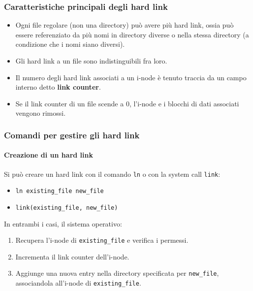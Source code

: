 \subsubsection{Caratteristiche principali degli hard link}
\begin{itemize}
    \item Ogni file regolare (non una directory) può avere più hard link, ossia può essere referenziato da più nomi in directory diverse o nella stessa directory (a condizione che i nomi siano diversi).
    \item Gli hard link a un file sono indistinguibili fra loro.
    \item Il numero degli hard link associati a un i-node è tenuto traccia da un campo interno detto \textbf{link counter}.
    \item Se il link counter di un file scende a 0, l'i-node e i blocchi di dati associati vengono rimossi.
\end{itemize}

\subsubsection{Comandi per gestire gli hard link}
\paragraph{Creazione di un hard link}
Si può creare un hard link con il comando \texttt{ln} o con la system call \texttt{link}:
\begin{itemize}
    \item \texttt{ln existing\_file new\_file}
    \item \texttt{link(existing\_file, new\_file)}
\end{itemize}
In entrambi i casi, il sistema operativo:
\begin{enumerate}
    \item Recupera l'i-node di \texttt{existing\_file} e verifica i permessi.
    \item Incrementa il link counter dell'i-node.
    \item Aggiunge una nuova entry nella directory specificata per \texttt{new\_file}, associandola all'i-node di \texttt{existing\_file}.
\end{enumerate}

